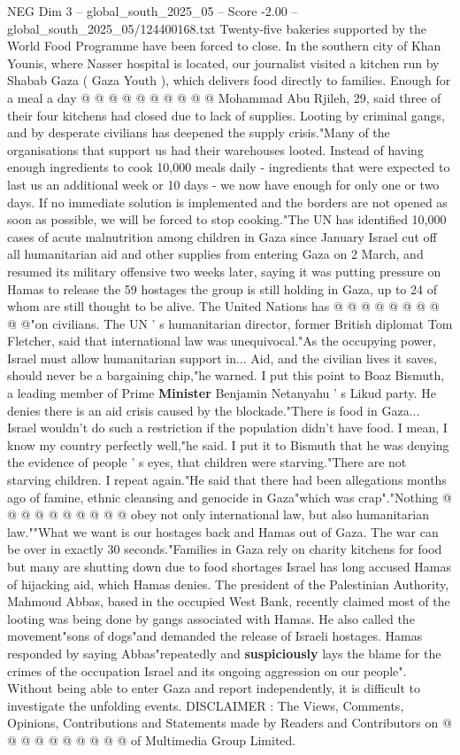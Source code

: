 \begin{textsample}{NEG Dim 3 – global\_south\_2025\_05 – Score -2.00 – global\_south\_2025\_05/124400168.txt}
Twenty-five bakeries supported by the World Food Programme have been forced to close.
In the southern city of Khan Younis, where Nasser hospital is located, our journalist visited a kitchen run by Shabab Gaza ( Gaza Youth ), which delivers food directly to families.
Enough for a meal a day @ @ @ @ @ @ @ @ @ @ Mohammad Abu Rjileh, 29, said three of their four kitchens had closed due to lack of supplies.
Looting by criminal gangs, and by desperate civilians has deepened the supply crisis."Many of the organisations that support us had their warehouses looted.
Instead of having enough ingredients to cook 10,000 meals daily - ingredients that were expected to last us an additional week or 10 days - we now have enough for only one or two days.
If no immediate solution is implemented and the borders are not opened as soon as possible, we will be forced to stop cooking."The UN has identified 10,000 cases of acute malnutrition among children in Gaza since January Israel cut off all humanitarian aid and other supplies from entering Gaza on 2 March, and resumed its military offensive two weeks later, saying it was putting pressure on Hamas to release the 59 hostages the group is still holding in Gaza, up to 24 of whom are still thought to be alive.
The United Nations has @ @ @ @ @ @ @ @ @ @"on civilians.
The UN ' s humanitarian director, former British diplomat Tom Fletcher, said that international law was unequivocal."As the occupying power, Israel must allow humanitarian support in...
Aid, and the civilian lives it saves, should never be a bargaining chip,"he warned.
I put this point to Boaz Bismuth, a leading member of Prime \textbf{Minister} Benjamin Netanyahu ' s Likud party.
He denies there is an aid crisis caused by the blockade."There is food in Gaza...
Israel wouldn't do such a restriction if the population didn't have food.
I mean, I know my country perfectly well,"he said.
I put it to Bismuth that he was denying the evidence of people ' s eyes, that children were starving."There are not starving children.
I repeat again."He said that there had been allegations months ago of famine, ethnic cleansing and genocide in Gaza"which was crap"."Nothing @ @ @ @ @ @ @ @ @ @ obey not only international law, but also humanitarian law.""What we want is our hostages back and Hamas out of Gaza.
The war can be over in exactly 30 seconds."Families in Gaza rely on charity kitchens for food but many are shutting down due to food shortages Israel has long accused Hamas of hijacking aid, which Hamas denies.
The president of the Palestinian Authority, Mahmoud Abbas, based in the occupied West Bank, recently claimed most of the looting was being done by gangs associated with Hamas.
He also called the movement"sons of dogs"and demanded the release of Israeli hostages.
Hamas responded by saying Abbas"repeatedly and \textbf{suspiciously} lays the blame for the crimes of the occupation Israel and its ongoing aggression on our people".
Without being able to enter Gaza and report independently, it is difficult to investigate the unfolding events.
DISCLAIMER : The Views, Comments, Opinions, Contributions and Statements made by Readers and Contributors on @ @ @ @ @ @ @ @ @ @ of Multimedia Group Limited.


\end{textsample}
